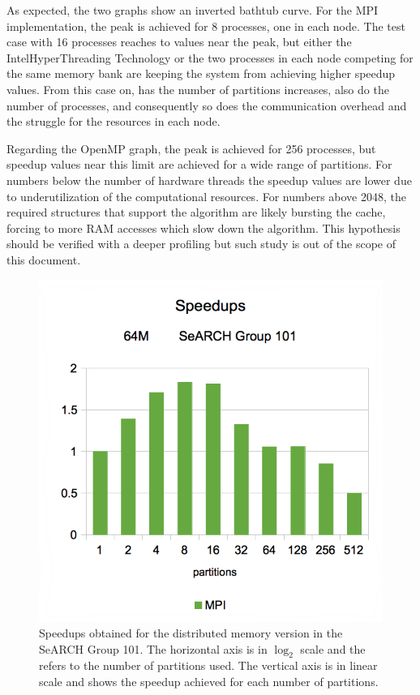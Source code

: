 \documentclass[abstract=on,9pt,twocolumn]{scrartcl}
\begin{document}
As expected, the two graphs show an inverted bathtub curve. For the MPI implementation, the peak is achieved for 8 processes, one in each node. The test case with 16 processes reaches to values near the peak, but either the Intel\textregistered HyperThreading Technology or the two processes in each node competing for the same memory bank are keeping the system from achieving higher speedup values. From this case on, has the number of partitions increases, also do the number of processes, and consequently so does the communication overhead and the struggle for the resources in each node.

Regarding the OpenMP graph, the peak is achieved for 256 processes, but speedup values near this limit are achieved for a wide range of partitions. For numbers below the number of hardware threads the speedup values are lower due to underutilization of the computational resources. For numbers above 2048, the required structures that support the algorithm are likely bursting the cache, forcing to more RAM accesses which slow down the algorithm. This hypothesis should be verified with a deeper profiling but such study is out of the scope of this document.

\begin{figure}[t]
	\begin{center}
		\includegraphics[width=\columnwidth]{images/101-speedups-mpi.png}
	\end{center}
	\caption{Speedups obtained for the distributed memory version in the SeARCH Group 101. The horizontal axis is in $\log_{2}$ scale and the refers to the number of partitions used. The vertical axis is in linear scale and shows the speedup achieved for each number of partitions.}
	\label{fig:mpi}
\end{figure}
		
\end{document}
